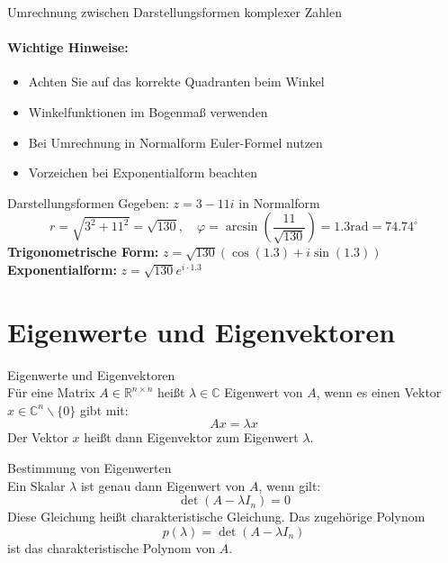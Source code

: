 \begin{KR}{Umrechnung zwischen Darstellungsformen komplexer Zahlen}
\paragraph{Wichtige Hinweise:}
\begin{itemize}
   \item Achten Sie auf das korrekte Quadranten beim Winkel
   \item Winkelfunktionen im Bogenmaß verwenden
   \item Bei Umrechnung in Normalform Euler-Formel nutzen
   \item Vorzeichen bei Exponentialform beachten
\end{itemize}
\end{KR}


\begin{example2}{Darstellungsformen}
Gegeben: $z = 3 - 11i$ in Normalform
$$r = \sqrt{3^2 + 11^2} = \sqrt{130}, \quad \varphi = \arcsin(\frac{11}{\sqrt{130}}) = 1.3 \text{rad} = 74.74^{\circ}$$
\textbf{Trigonometrische Form:} $z = \sqrt{130}(\cos(1.3) + i\sin(1.3))$
\vspace{2mm}\\
\textbf{Exponentialform:} $z = \sqrt{130}e^{i\cdot 1.3}$
\end{example2}


\section{Eigenwerte und Eigenvektoren}

\begin{definition}{Eigenwerte und Eigenvektoren}\\
Für eine Matrix $A \in \mathbb{R}^{n\times n}$ heißt $\lambda \in \mathbb{C}$ Eigenwert von $A$, wenn es einen Vektor $x \in \mathbb{C}^n \backslash \{0\}$ gibt mit:
\vspace{-2mm}\\
$$Ax = \lambda x$$
Der Vektor $x$ heißt dann Eigenvektor zum Eigenwert $\lambda$.
\end{definition}

\begin{concept}{Bestimmung von Eigenwerten}\\
Ein Skalar $\lambda$ ist genau dann Eigenwert von $A$, wenn gilt:
\vspace{-2mm}\\
$$\det(A - \lambda I_n) = 0$$
Diese Gleichung heißt charakteristische Gleichung. Das zugehörige Polynom
\vspace{-2mm}
$$p(\lambda) = \det(A - \lambda I_n)$$
ist das charakteristische Polynom von $A$.
\end{concept}

